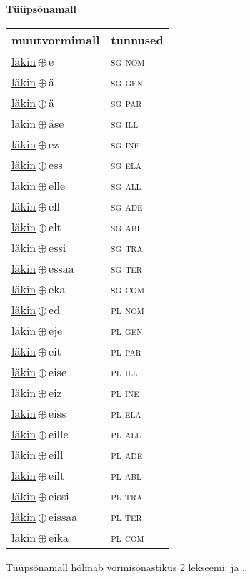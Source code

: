 

\vspace{3.5em}
\noindent \begin{minipage}{\textwidth}
\noindent \textbf{Tüüpsõnamall \,}\\

\begin{sideways}
\begin{tabular}{l l}
muutvormimall & tunnused \\
\hline
\underline{läkin}\,$\oplus$\,e & \textsc{ sg nom } \\
\underline{läkin}\,$\oplus$\,ä & \textsc{ sg gen } \\
\underline{läkin}\,$\oplus$\,ä & \textsc{ sg par } \\
\underline{läkin}\,$\oplus$\,äse & \textsc{ sg ill } \\
\underline{läkin}\,$\oplus$\,ez & \textsc{ sg ine } \\
\underline{läkin}\,$\oplus$\,ess & \textsc{ sg ela } \\
\underline{läkin}\,$\oplus$\,elle & \textsc{ sg all } \\
\underline{läkin}\,$\oplus$\,ell & \textsc{ sg ade } \\
\underline{läkin}\,$\oplus$\,elt & \textsc{ sg abl } \\
\underline{läkin}\,$\oplus$\,essi & \textsc{ sg tra } \\
\underline{läkin}\,$\oplus$\,essaa & \textsc{ sg ter } \\
\underline{läkin}\,$\oplus$\,eka & \textsc{ sg com } \\
\underline{läkin}\,$\oplus$\,ed & \textsc{ pl nom } \\
\underline{läkin}\,$\oplus$\,eje & \textsc{ pl gen } \\
\underline{läkin}\,$\oplus$\,eit & \textsc{ pl par } \\
\underline{läkin}\,$\oplus$\,eise & \textsc{ pl ill } \\
\underline{läkin}\,$\oplus$\,eiz & \textsc{ pl ine } \\
\underline{läkin}\,$\oplus$\,eiss & \textsc{ pl ela } \\
\underline{läkin}\,$\oplus$\,eille & \textsc{ pl all } \\
\underline{läkin}\,$\oplus$\,eill & \textsc{ pl ade } \\
\underline{läkin}\,$\oplus$\,eilt & \textsc{ pl abl } \\
\underline{läkin}\,$\oplus$\,eissi & \textsc{ pl tra } \\
\underline{läkin}\,$\oplus$\,eissaa & \textsc{ pl ter } \\
\underline{läkin}\,$\oplus$\,eika & \textsc{ pl com } \\
\end{tabular}
\end{sideways}
\label{tab:tüüpsõnamall-läkine}

\end{minipage}

 
\vspace{1em}
\noindent Tüüpsõnamall  hõlmab vormisõnastikus 2 lekseemi:  ja .
